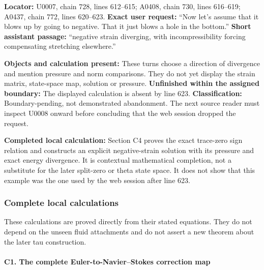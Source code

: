 \textbf{Locator:} U0007, chain 728, lines 612--615; A0408, chain 730,
lines 616--619; A0437, chain 772, lines 620--623. \textbf{Exact user
request:} ``Now let's assume that it blows up by going to negative. That
it just blows a hole in the bottom.'' \textbf{Short assistant passage:}
``negative strain diverging, with incompressibility forcing compensating
stretching elsewhere.''

\textbf{Objects and calculation present:} These turns choose a direction
of divergence and mention pressure and norm comparisons. They do not yet
display the strain matrix, state-space map, solution or pressure.
\textbf{Unfinished within the assigned boundary:} The displayed
calculation is absent by line 623. \textbf{Classification:}
Boundary-pending, not demonstrated abandonment. The next source reader
must inspect U0008 onward before concluding that the web session dropped
the request.

\textbf{Completed local calculation:} Section C4 proves the exact
trace-zero sign relation and constructs an explicit negative-strain
solution with its pressure and exact energy divergence. It is contextual
mathematical completion, not a substitute for the later split-zero or
theta state space. It does not show that this example was the one used
by the web session after line 623.

\subsubsection{Complete local
calculations}\label{TranscriptLedgerStage:complete-local-calculations}

These calculations are proved directly from their stated equations. They
do not depend on the unseen fluid attachments and do not assert a new
theorem about the later tau construction.

\paragraph{C1. The complete Euler-to-Navier--Stokes correction
map}\label{TranscriptLedgerStage:c1.-the-complete-euler-to-navierstokes-correction-map}


